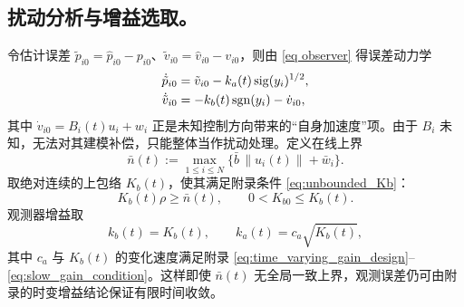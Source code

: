 \subsection{扰动分析与增益选取。}
令估计误差 $\tilde p_{i0}=\hat p_{i0}-p_{i0}$、$\tilde v_{i0}=\hat v_{i0}-v_{i0}$，则由 \eqref{eq observer} 得误差动力学
\begin{align*}
    \dot{\tilde p}_{i0}&=\tilde v_{i0}-k_a(t) \operatorname{sig}(y_i)^{1/2},\\
    \dot{\tilde v}_{i0}&=-k_b(t)\operatorname{sgn}(y_i)-\dot v_{i0},
\end{align*}
其中 $\dot v_{i0}=B_i(t)u_i+w_i$ 正是未知控制方向带来的“自身加速度”项。由于 $B_i$ 未知，无法对其建模补偿，只能整体当作扰动处理。定义在线上界
\[
    \bar n(t):=\max_{1\le i\le N}\{\bar b\,\|u_i(t)\|+\bar w_i\}.
\]
取绝对连续的上包络 $K_b(t)$，使其满足附录条件 \eqref{eq:unbounded_Kb}：
\[
    K_b(t)\rho\ge\bar n(t),\qquad 0<K_{b0}\le K_b(t).
\]
观测器增益取
\[
    k_b(t)=K_b(t),\qquad k_a(t)=c_a\sqrt{K_b(t)},
\]
其中 $c_a$ 与 $K_b(t)$ 的变化速度满足附录 \eqref{eq:time_varying_gain_design}--\eqref{eq:slow_gain_condition}。这样即使 $\bar n(t)$ 无全局一致上界，观测误差仍可由附录的时变增益结论保证有限时间收敛。

